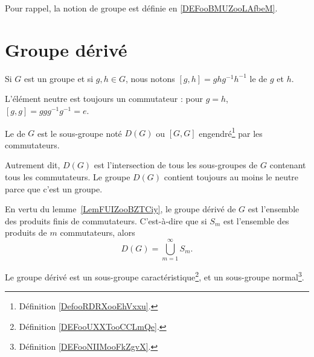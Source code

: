 
Pour rappel, la notion de groupe est définie en \ref{DEFooBMUZooLAfbeM}.

\section{Groupe dérivé}

\begin{definition}      \label{DEFooVHZAooUgmesE}
	Si \( G\) est un groupe et si \( g,h\in G\), nous notons \( [g,h]=ghg^{-1}h^{-1}\) le  de \( g\) et \( h\).
\end{definition}

L'élément neutre est toujours un commutateur : pour \( g=h \), \( [g,g]=ggg^{-1}g^{-1}=e \).

\begin{definition}      \label{DEFooBNLPooShKYXa}
	Le  de \( G\) est le sous-groupe noté \( D(G)\) ou \( [G,G]\) engendré\footnote{Définition \ref{DefooRDRXooEhVxxu}.} par les commutateurs.
\end{definition}
Autrement dit, \( D(G)\) est l'intersection de tous les sous-groupes de \( G\) contenant tous les commutateurs. Le groupe \( D(G)\) contient toujours au moins le neutre parce que c'est un groupe.

En vertu du lemme~\ref{LemFUIZooBZTCiy}, le groupe dérivé de \( G\) est l'ensemble des produits finis de commutateurs. C'est-à-dire que si \( S_m\) est l'ensemble des produits de \( m\) commutateurs, alors
\begin{equation}
	D(G)=\bigcup_{m=1}^{\infty}S_m.
\end{equation}

\begin{lemma}   \label{LemMMOCooDJJJhy}
	Le groupe dérivé est un sous-groupe caractéristique\footnote{Définition \ref{DEFooUXXTooCCLmQe}.}, et un sous-groupe normal\footnote{Définition \ref{DEFooNIIMooFkZgvX}.}.
\end{lemma}

